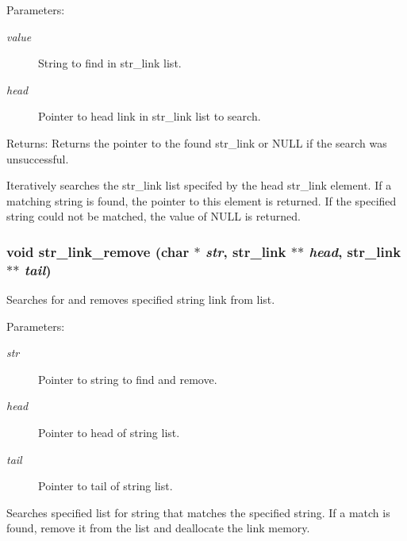 \begin{Desc}
\item[Parameters:]
\begin{description}
\item[{\em value}]String to find in str\_\-link list. \item[{\em head}]Pointer to head link in str\_\-link list to search. \end{description}
\end{Desc}
\begin{Desc}
\item[Returns:]Returns the pointer to the found str\_\-link or NULL if the search was unsuccessful.\end{Desc}
Iteratively searches the str\_\-link list specifed by the head str\_\-link element. If a matching string is found, the pointer to this element is returned. If the specified string could not be matched, the value of NULL is returned. 
\subsubsection{\setlength{\rightskip}{0pt plus 5cm}void str\_\-link\_\-remove (char $\ast$ {\em str}, {\bf str\_\-link} $\ast$$\ast$ {\em head}, {\bf str\_\-link} $\ast$$\ast$ {\em tail})}\label{link_8h_a16}


Searches for and removes specified string link from list. 

\begin{Desc}
\item[Parameters:]
\begin{description}
\item[{\em str}]Pointer to string to find and remove. \item[{\em head}]Pointer to head of string list. \item[{\em tail}]Pointer to tail of string list.\end{description}
\end{Desc}
Searches specified list for string that matches the specified string. If a match is found, remove it from the list and deallocate the link memory. 